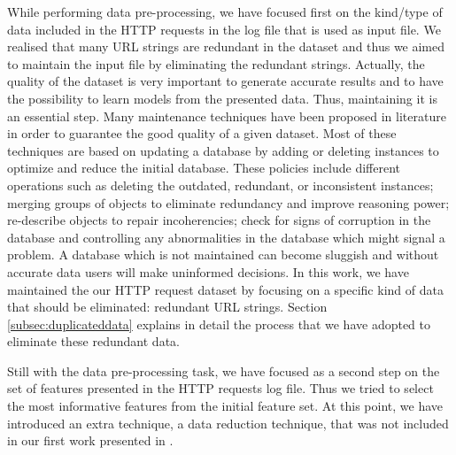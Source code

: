 \documentclass{llncs}
\begin{document}
While performing data pre-processing, we have focused first on the
kind/type of data included in the HTTP requests in the log file that is
used as input
file. We realised
 that many URL strings are redundant in the dataset and thus we aimed
 to maintain the input file %
 by eliminating the redundant
 strings. Actually, the quality of the dataset is very important to
 generate accurate results and to have the possibility to learn models
 from the presented data. %
 Thus, maintaining it is an essential
 step. %
Many maintenance techniques have been proposed in literature
\cite{wilson2001maintaining} in order to guarantee the good quality of
a given dataset.   Most of these techniques are based on updating a
database by adding or deleting instances to optimize and reduce the
initial database.  %
These policies include different operations such as deleting the
outdated, redundant, or inconsistent instances; merging groups of
objects to eliminate redundancy and improve reasoning power;
re-describe objects to repair incoherencies; check for signs of
corruption in the database and controlling any abnormalities in the
database which might signal a problem. A database which is not
maintained %
can become sluggish %
and without accurate data users will make uninformed decisions. In
this work, we have maintained the our HTTP request dataset by focusing
on a specific kind of data that should be eliminated:
redundant URL strings. Section \ref{subsec:duplicateddata} explains in
detail the process that we have adopted to eliminate these redundant
data.

Still with the data pre-processing task, we have focused as a second
step on %
 the set of features presented in the HTTP requests log file. Thus
 we tried to select the most informative features from the initial
 feature set. At this point, we have introduced an extra technique, a
 data reduction technique, that was not included in our first work
 presented in \cite{ECTA}.  %
\end{document}
